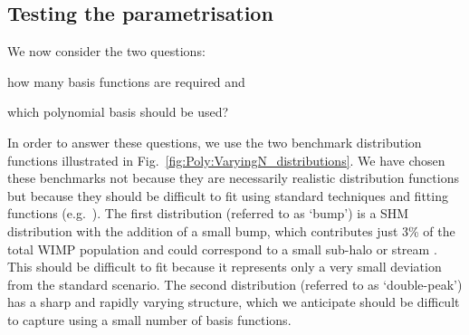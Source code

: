 \subsection{Testing the parametrisation}
\label{sec:Poly:test}

We now consider the two questions: \begin{inparaenum}[(i)] \item how many basis functions are required and \item which polynomial basis should be used? \end{inparaenum} In order to answer these questions, we use the two benchmark distribution functions illustrated in Fig.~\ref{fig:Poly:VaryingN_distributions}. We have chosen these benchmarks not because they are necessarily realistic distribution functions but because they should be difficult to fit using standard techniques and fitting functions (e.g.~\cite{Lisanti:2010}). The first distribution (referred to as `bump') is a SHM distribution with the addition of a small bump, which contributes just 3\% of the total WIMP population and could correspond to a small sub-halo or stream \cite{Vogelsberger:2009}. This should be difficult to fit because it represents only a very small deviation from the standard scenario. The second distribution (referred to as `double-peak') has a sharp and rapidly varying structure, which we anticipate should be difficult to capture using a small number of basis functions.

